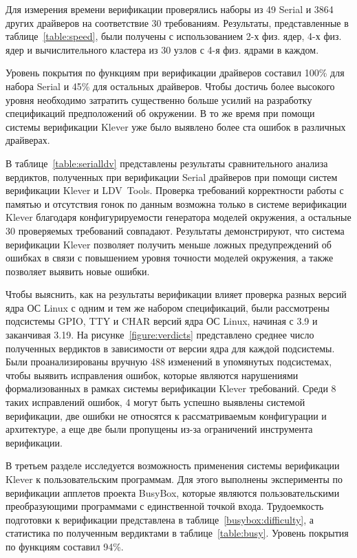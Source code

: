 \documentclass[%
autoref,
colorlinks,  
facsimile,   %
]{disser}
\begin{document}
Для измерения времени верификации проверялись наборы из 49 Serial и 3864 других драйверов на соответствие 30 требованиям.
Результаты, представленные в таблице~\ref{table:speed}, были получены с использованием 2-х физ. ядер, 4-х физ. ядер и вычислительного кластера из 30 узлов с 4-я физ. ядрами в каждом.

Уровень покрытия по функциям при верификации драйверов составил 100\% для набора Serial и 45\% для остальных драйверов.
Чтобы достичь более высокого уровня необходимо затратить существенно больше усилий на разработку спецификаций предположений об окружении.
В то же время при помощи системы верификации Klever уже было выявлено более ста ошибок в различных драйверах.

В таблице~\ref{table:serialldv} представлены результаты сравнительного анализа вердиктов, полученных при верификации Serial драйверов при помощи систем верификации Klever и LDV~Tools.
Проверка требований корректности работы с памятью и отсутствия гонок по данным возможна только в системе верификации Klever благодаря конфигурируемости генератора моделей окружения, а остальные 30 проверяемых требований совпадают.
Результаты демонстрируют, что система верификации Klever позволяет получить меньше ложных предупреждений об ошибках в связи с повышением уровня точности моделей окружения, а также позволяет выявить новые ошибки.

Чтобы выяснить, как на результаты верификации влияет проверка разных версий ядра ОС Linux с одним и тем же набором спецификаций, были рассмотрены подсистемы GPIO, TTY и CHAR версий ядра ОС Linux, начиная с 3.9 и заканчивая 3.19.
На рисунке~\ref{figure:verdicts} представлено среднее число полученных вердиктов в зависимости от версии ядра для каждой подсистемы.
Были проанализированы вручную 488 изменений в упомянутых подсистемах, чтобы выявить исправления ошибок, которые являются нарушениями формализованных в рамках системы верификации Klever требований.
Среди 8 таких исправлений ошибок, 4 могут быть успешно выявлены системой верификации, две ошибки не относятся к рассматриваемым конфигурации и архитектуре, а еще две были пропущены из-за ограничений инструмента верификации.

В третьем разделе исследуется возможность применения системы верификации Klever к пользовательским программам.
Для этого выполнены эксперименты по верификации апплетов проекта BusyBox, которые являются пользовательскими преобразующими программами с единственной точкой входа.
Трудоемкость подготовки к верификации представлена в таблице~\ref{busybox:difficulty}, а статистика по полученным вердиктами в таблице~\ref{table:busy}.
Уровень покрытия по функциям составил 94\%.
\end{document}
